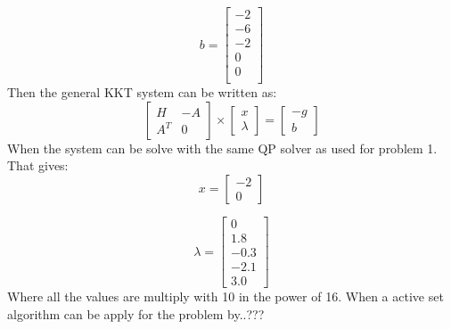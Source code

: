 \[b= \begin{bmatrix}
	-2 \\-6 \\-2 \\0 \\0 \\
\end{bmatrix}\]
Then the general KKT system can be written as:
\[\begin{bmatrix}
	H & -A \\A^T & 0
\end{bmatrix}\times
	\begin{bmatrix}
		x\\ \lambda
	\end{bmatrix}=
		\begin{bmatrix}
			-g\\ b
	\end{bmatrix}\]
When the system can be solve with the same QP solver as used for problem 1. That gives:
\[x=\begin{bmatrix}
	-2 \\ 0
\end{bmatrix}\]

\[\lambda=\begin{bmatrix}
	0 \\1.8 \\-0.3 \\-2.1 \\ 3.0
\end{bmatrix}\]
Where all the values are multiply with 10 in the power of 16. 
When a active set algorithm can be apply for the problem by..???
